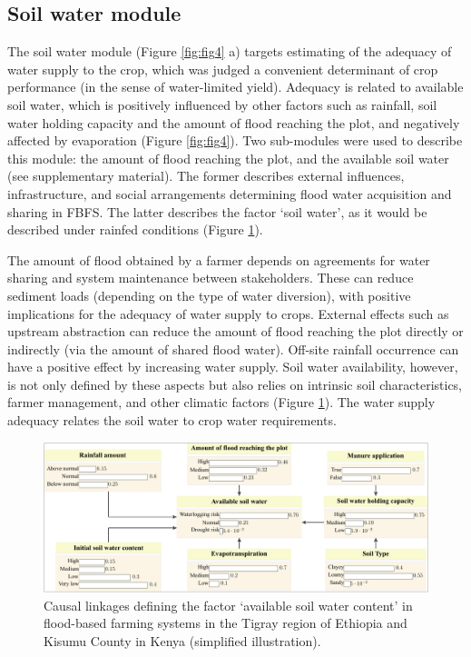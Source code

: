 \documentclass[]{elsarticle} %
\begin{document}
\hypertarget{ref42}{%
\subsection{Soil water module}\label{ref42}}

The soil water module (Figure \ref{fig:fig4} a) targets estimating of the adequacy of water supply to the crop, which was judged a convenient determinant of crop performance (in the sense of water-limited yield). Adequacy is related to available soil water, which is positively influenced by other factors such as rainfall, soil water holding capacity and the amount of flood reaching the plot, and negatively affected by evaporation (Figure \ref{fig:fig4}). Two sub-modules were used to describe this module: the amount of flood reaching the plot, and the available soil water (see supplementary material). The former describes external influences, infrastructure, and social arrangements determining flood water acquisition and sharing in FBFS. The latter describes the factor `soil water', as it would be described under rainfed conditions (Figure \ref{fig:fig5}).

The amount of flood obtained by a farmer depends on agreements for water sharing and system maintenance between stakeholders. These can reduce sediment loads (depending on the type of water diversion), with positive implications for the adequacy of water supply to crops. External effects such as upstream abstraction can reduce the amount of flood reaching the plot directly or indirectly (via the amount of shared flood water). Off-site rainfall occurrence can have a positive effect by increasing water supply. Soil water availability, however, is not only defined by these aspects but also relies on intrinsic soil characteristics, farmer management, and other climatic factors (Figure \ref{fig:fig5}). The water supply adequacy relates the soil water to crop water requirements.

\begin{figure}[!h]

{\centering \includegraphics[width=1\linewidth,]{Modelling_FBFS_files/figure-latex/fig5-plot-1} 

}

\caption{Causal linkages defining the factor ‘available soil water content’ in flood-based farming systems in the Tigray region of Ethiopia and Kisumu County in Kenya (simplified illustration).}\label{fig:fig5}
\end{figure}
\end{document}

